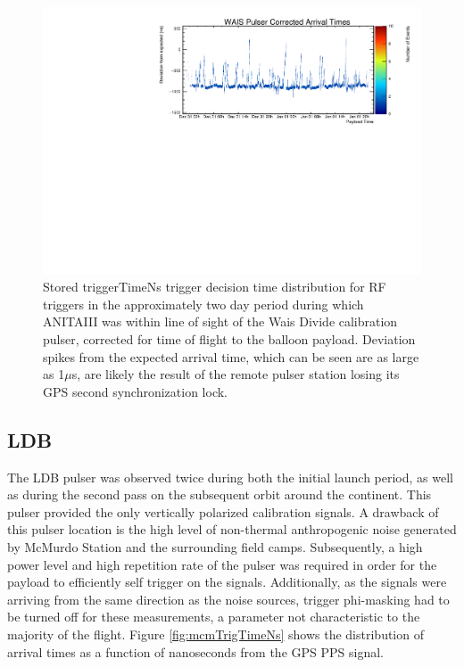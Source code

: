 	\begin{figure}
		\includegraphics[width=\textwidth]{figures/waisPulserCorrNs}
		\caption{Stored triggerTimeNs trigger decision time distribution for RF triggers in the approximately two day period during which ANITAIII was within line of sight of the Wais Divide calibration pulser, corrected for time of flight to the balloon payload.  Deviation spikes from the expected arrival time, which can be seen are as large as 1$\mu$s, are likely the result of the remote pulser station losing its GPS second synchronization lock.}
		\label{fig:waisTrigTimeCorr}
	\end{figure}		
		
		

	\subsection{LDB}
		The LDB pulser was observed twice during both the initial launch period, as well as during the second pass on the subsequent orbit around the continent.  This pulser provided the only vertically polarized calibration signals.  A drawback of this pulser location is the high level of non-thermal anthropogenic noise generated by McMurdo Station and the surrounding field camps.  Subsequently, a high power level and high repetition rate of the pulser was required in order for the payload to efficiently self trigger on the signals.  Additionally, as the signals were arriving from the same direction as the noise sources, trigger phi-masking had to be turned off for these measurements, a parameter not characteristic to the majority of the flight.  Figure \ref{fig:mcmTrigTimeNs} shows the distribution of arrival times as a function of nanoseconds from the GPS PPS signal.
	
